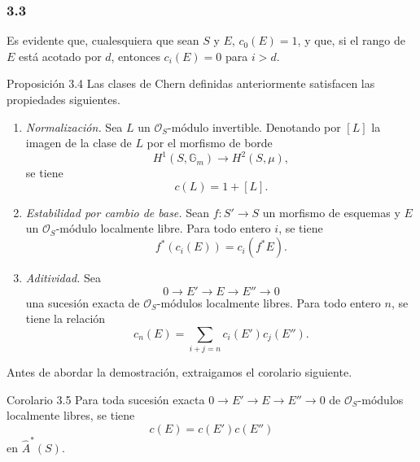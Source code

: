 \subsubsection*{3.3}
Es evidente que, cualesquiera que sean $S$ y $E$, $c_0(E)=1$, y que, si el rango de $E$ está acotado por $d$, entonces $c_i(E)=0$ para $i>d$.

\begin{statement}{Proposición 3.4}
Las clases de Chern definidas anteriormente satisfacen las propiedades siguientes.
\begin{enumerate}[label=(\roman*)]
\item \emph{Normalización.} Sea $L$ un $\mathcal O_S$-módulo invertible. Denotando por $[L]$ la imagen de la clase de $L$ por el morfismo de borde
\[
H^1(S,\mathbb G_m)\longrightarrow H^2(S,\mu),
\]
se tiene
\[
c(L)=1+[L].
\]
\item \emph{Estabilidad por cambio de base.} Sean $f:S'\to S$ un morfismo de esquemas y $E$ un $\mathcal O_S$-módulo localmente libre. Para todo entero $i$, se tiene
\[
f^*(c_i(E))=c_i(f^*E).
\]
\item \emph{Aditividad.} Sea
\[
0\to E'\to E\to E''\to0
\]
una sucesión exacta de $\mathcal O_S$-módulos localmente libres. Para todo entero $n$, se tiene la relación
\[
c_n(E)=\sum_{i+j=n}c_i(E')c_j(E'').
\]
\end{enumerate}
\end{statement}

Antes de abordar la demostración, extraigamos el corolario siguiente.

\begin{statement}{Corolario 3.5}
Para toda sucesión exacta $0\to E'\to E\to E''\to0$ de $\mathcal O_S$-módulos localmente libres, se tiene
\[
c(E)=c(E')c(E'')
\]
en $\widehat A^*(S)$.
\end{statement}
